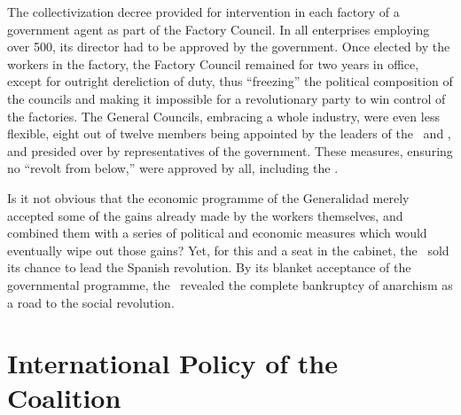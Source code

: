 The collectivization decree provided for intervention in each factory of a government agent as part of the Factory Council. In all enterprises employing over 500, its director had to be approved by the government. Once elected by the workers in the factory, the Factory Council remained for two years in office, except for outright dereliction of duty, thus ``freezing'' the political composition of the councils and making it impossible for a revolutionary party to win control of the factories. The General Councils, embracing a whole industry, were even less flexible, eight out of twelve members being appointed by the leaders of the \UGT\ and \CNT, and presided over by representatives of the government. These measures, ensuring no ``revolt from below,'' were approved by all, including the \POUM.

Is it not obvious that the economic programme of the Generalidad merely accepted some of the gains already made by the workers themselves, and combined them with a series of political and economic measures which would eventually wipe out those gains? Yet, for this and a seat in the cabinet, the \POUM\ sold its chance to lead the Spanish revolution. By its blanket acceptance of the governmental programme, the \CNT\ revealed the complete bankruptcy of anarchism as a road to the social revolution.

\section{International Policy of the Coalition}

